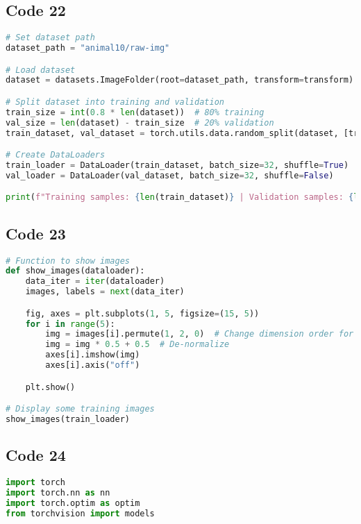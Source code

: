 \documentclass{article}
\begin{document}
\subsection*{Code 22}
\begin{lstlisting}[language=Python]
# Set dataset path
dataset_path = "animal10/raw-img"

# Load dataset
dataset = datasets.ImageFolder(root=dataset_path, transform=transform)

# Split dataset into training and validation
train_size = int(0.8 * len(dataset))  # 80% training
val_size = len(dataset) - train_size  # 20% validation
train_dataset, val_dataset = torch.utils.data.random_split(dataset, [train_size, val_size])

# Create DataLoaders
train_loader = DataLoader(train_dataset, batch_size=32, shuffle=True)
val_loader = DataLoader(val_dataset, batch_size=32, shuffle=False)

print(f"Training samples: {len(train_dataset)} | Validation samples: {len(val_dataset)}")

\end{lstlisting}

\subsection*{Code 23}
\begin{lstlisting}[language=Python]
# Function to show images
def show_images(dataloader):
    data_iter = iter(dataloader)
    images, labels = next(data_iter)

    fig, axes = plt.subplots(1, 5, figsize=(15, 5))
    for i in range(5):
        img = images[i].permute(1, 2, 0)  # Change dimension order for visualization
        img = img * 0.5 + 0.5  # De-normalize
        axes[i].imshow(img)
        axes[i].axis("off")

    plt.show()

# Display some training images
show_images(train_loader)
\end{lstlisting}

\subsection*{Code 24}
\begin{lstlisting}[language=Python]
import torch
import torch.nn as nn
import torch.optim as optim
from torchvision import models
\end{lstlisting}
\end{document}
